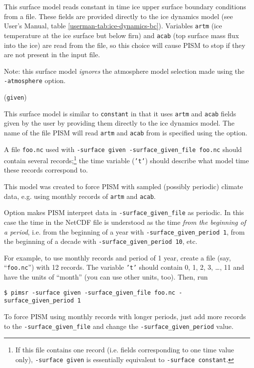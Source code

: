 \documentclass[titlepage,letterpaper,final]{scrartcl}
\begin{document}
This surface model reads constant in time ice upper surface boundary conditions from a file. These fields are provided directly to the ice dynamics model (see User's Manual, table \ref*{userman-tab:ice-dynamics-bc}). Variables \texttt{artm} (ice temperature at the ice surface but below firn) and \texttt{acab} (top surface mass flux into the ice) are read from the file, so this choice will cause PISM to stop if they are not present in the input file.

Note: this surface model \emph{ignores} the atmosphere model selection made using the \texttt{-atmosphere} option.

(\texttt{given})

This surface model is similar to \texttt{constant} in that it uses \texttt{artm} and \texttt{acab} fields given by the user by providing them directly to the ice dynamics model. The name of the file PISM will read \texttt{artm} and \texttt{acab} from is specified using the  option.

A file \texttt{foo.nc} used with \texttt{-surface given -surface_given_file foo.nc} should contain several records;\footnote{If this file contains one record (i.e. fields corresponding to one time value only), \texttt{-surface given} is essentially equivalent to \texttt{-surface constant}.} the time variable (\texttt{'t'}) should describe what model time these records correspond to.

This model was created to force PISM with sampled (possibly periodic) climate data, e.g. using monthly records of \texttt{artm} and \texttt{acab}.

Option  makes PISM interpret data in \texttt{-surface_given_file} as periodic. In this case the time in the NetCDF file is understood as the time \emph{from the beginning of a period}, i.e. from the beginning of a year with \texttt{-surface_given_period 1}, from the beginning of a decade with \texttt{-surface_given_period 10}, etc.

For example, to use monthly records and period of 1 year, create a file (say, ``\texttt{foo.nc}'') with 12 records. The variable \texttt{'t'} should contain 0, 1, 2, 3, \dots, 11 and have the units of ``month'' (you can use other units, too). Then, run
\begin{verbatim}
$ pimsr -surface given -surface_given_file foo.nc -surface_given_period 1
\end{verbatim}%

To force PISM using monthly records with longer periods, just add more records to the \texttt{-surface_given_file}  and change the \texttt{-surface_given_period} value.
\end{document}
